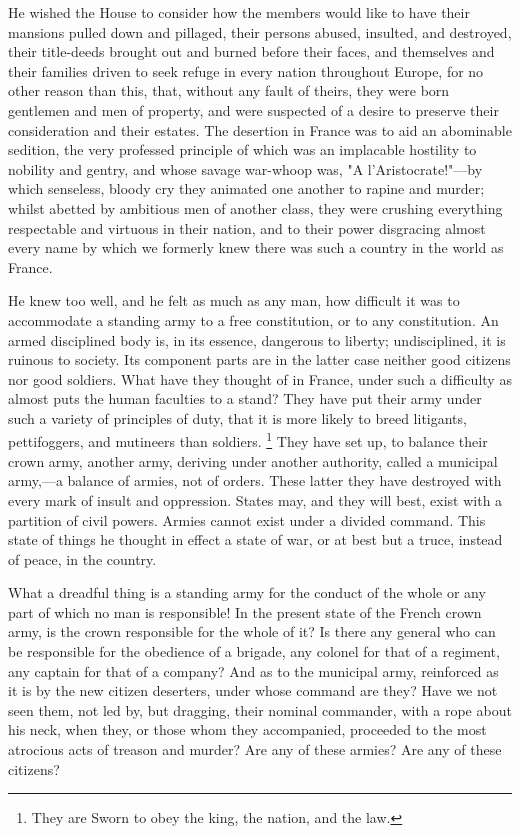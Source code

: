 He wished the House to consider how the members would like to have their mansions pulled down and pillaged, their persons abused, insulted, and destroyed, their title-deeds brought out and burned before their faces, and themselves and their families driven to seek refuge in every nation throughout Europe, for no other reason than this, that, without any fault of theirs, they were born gentlemen and men of property, and were suspected of a desire to preserve their consideration and their estates. The desertion in France was to aid an abominable sedition, the very professed principle of which was an implacable hostility to nobility and gentry, and whose savage war-whoop was, "A l'Aristocrate!"—by which senseless, bloody cry they animated one another to rapine and murder; whilst abetted by ambitious men of another class, they were crushing everything respectable and virtuous in their nation, and to their power disgracing almost every name by which we formerly knew there was such a country in the world as France.

He knew too well, and he felt as much as any man, how difficult it was to accommodate a standing army to a free constitution, or to any constitution. An armed disciplined body is, in its essence, dangerous to liberty; undisciplined, it is ruinous to society. Its component parts are in the latter case neither good citizens nor good soldiers. What have they thought of in France, under such a difficulty as almost puts the human faculties to a stand? They have put their army under such a variety of principles of duty, that it is more likely to breed litigants, pettifoggers, and mutineers than soldiers.
\footnote{ They are Sworn to obey the king, the nation, and the law.}
 They have set up, to balance their crown army, another army, deriving under another authority, called a municipal army,—a balance of armies, not of orders. These latter they have destroyed with every mark of insult and oppression. States may, and they will best, exist with a partition of civil powers. Armies cannot exist under a divided command. This state of things he thought in effect a state of war, or at best but a truce, instead of peace, in the country.

What a dreadful thing is a standing army for the conduct of the whole or any part of which no man is responsible! In the present state of the French crown army, is the crown responsible for the whole of it? Is there any general who can be responsible for the obedience of a brigade, any colonel for that of a regiment, any captain for that of a company? And as to the municipal army, reinforced as it is by the new citizen deserters, under whose command are they? Have we not seen them, not led by, but dragging, their nominal commander, with a rope about his neck, when they, or those whom they accompanied, proceeded to the most atrocious acts of treason and murder? Are any of these armies? Are any of these citizens?

